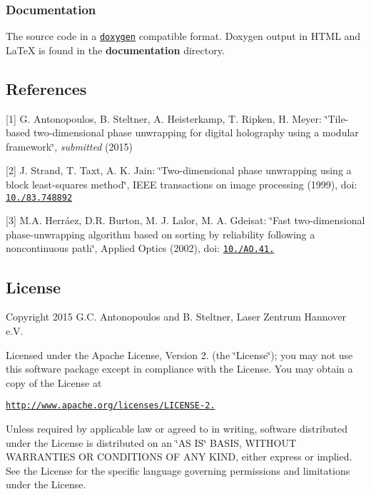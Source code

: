 \subsubsection*{Documentation}

The source code in a \href{https://www.stack.nl/~dimitri/doxygen/}{\tt doxygen} compatible format. Doxygen output in H\-T\-M\-L and La\-Te\-X is found in the {\bfseries documentation} directory.

\subsection*{References}

\mbox{[}1\mbox{]} G. Antonopoulos, B. Steltner, A. Heisterkamp, T. Ripken, H. Meyer\-: \char`\"{}\-Tile-\/based two-\/dimensional phase unwrapping for digital holography using a modular framework\char`\"{}, {\itshape submitted} (2015)

\mbox{[}2\mbox{]} J. Strand, T. Taxt, A. K. Jain\-: \char`\"{}\-Two-\/dimensional phase unwrapping using a block least-\/squares method\char`\"{}, I\-E\-E\-E transactions on image processing (1999), doi\-: \href{http://dx.doi.org/10.1109/83.748892}{\tt 10./83.748892}

\mbox{[}3\mbox{]} M.\-A. Herráez, D.\-R. Burton, M. J. Lalor, M. A. Gdeisat\-: \char`\"{}\-Fast two-\/dimensional phase-\/unwrapping algorithm based on sorting by reliability following a noncontinuous path\char`\"{}, Applied Optics (2002), doi\-: \href{http://dx.doi.org/10.1364/AO.41.007437}{\tt 10./\-A\-O.41.}

\subsection*{License}

Copyright 2015 G.\-C. Antonopoulos and B. Steltner, Laser Zentrum Hannover e.\-V.

Licensed under the Apache License, Version 2. (the \char`\"{}\-License\char`\"{}); you may not use this software package except in compliance with the License. You may obtain a copy of the License at

\href{http://www.apache.org/licenses/LICENSE-2.0}{\tt http\-://www.\-apache.\-org/licenses/\-L\-I\-C\-E\-N\-S\-E-\/2.}

Unless required by applicable law or agreed to in writing, software distributed under the License is distributed on an \char`\"{}\-A\-S I\-S\char`\"{} B\-A\-S\-I\-S, W\-I\-T\-H\-O\-U\-T W\-A\-R\-R\-A\-N\-T\-I\-E\-S O\-R C\-O\-N\-D\-I\-T\-I\-O\-N\-S O\-F A\-N\-Y K\-I\-N\-D, either express or implied. See the License for the specific language governing permissions and limitations under the License. 